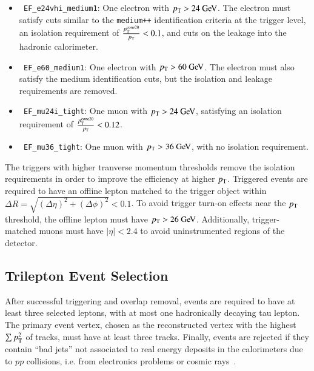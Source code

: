 \begin{itemize}
	\item \texttt{ EF\_e24vhi\_medium1}: One electron with $\pt>24 \GeV$. The electron must satisfy cuts similar to the \texttt{medium++} identification criteria at the trigger level, an isolation requirement of $\frac{p_{\text{T}}^{\mathrm{cone}20}}{p_{\text{T}}}<0.1$, and cuts on the leakage into the hadronic calorimeter.
	\item \texttt{ EF\_e60\_medium1}: One electron with $\pt>60 \GeV$. The electron must also satisfy the medium identification cuts, but the isolation and leakage requirements are removed.
	\item \texttt{ EF\_mu24i\_tight}: One muon with $\pt>24 \GeV$, satisfying an isolation requirement of $\frac{p_{\text{T}}^{\mathrm{cone}20}}{p_{\text{T}}}<0.12$.
	\item \texttt{ EF\_mu36\_tight}: One muon with $\pt>36 \GeV$, with no isolation requirement.
\end{itemize}

The triggers with higher tranverse momentum thresholds remove the isolation requirements in order to improve the efficiency at higher $p_{\text{T}}$. Triggered events are required to have an offline lepton matched to the trigger object within $\Delta R=\sqrt{(\Delta\eta)^2+(\Delta\phi)^2} < 0.1$. To avoid trigger turn-on effects near the $p_{\text{T}}$ threshold, the offline lepton must have $\pt>26 \GeV$. Additionally, trigger-matched muons must have $|\eta|<2.4$ to avoid uninstrumented regions of the detector.


\subsection{Trilepton Event Selection}\label{sec:model-independent-trilepton-event-selection}
After successful triggering and overlap removal, events are required to have at least three selected leptons, with at most one hadronically decaying tau lepton. The primary event vertex, chosen as the reconstructed vertex with the highest $\sum p_{\text{T}}^2$ of tracks, must have at least three tracks. Finally, events are rejected if they contain ``bad jets'' not associated to real energy deposits in the calorimeters due to $pp$ collisions, i.e. from electronics problems or cosmic rays~\cite{TheATLASCollaboration:2015ds}.


